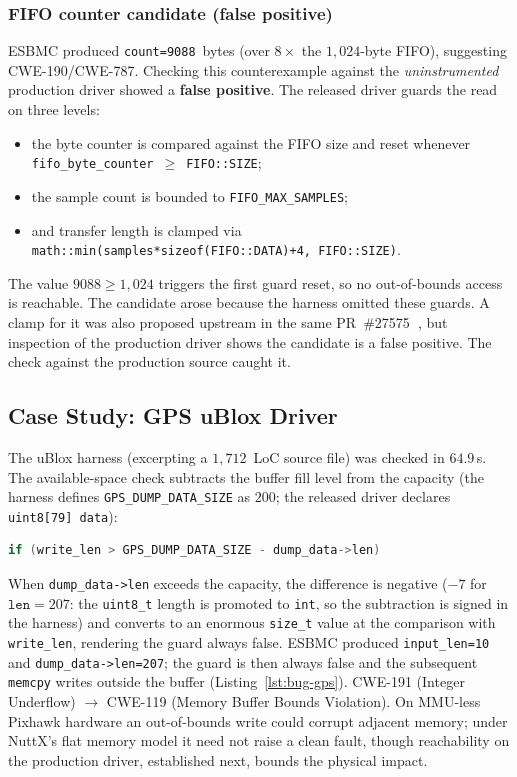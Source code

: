 \documentclass[conference]{IEEEtran}
\newcommand{\entra}[1]{#1}
\begin{document}
\subsubsection{FIFO counter candidate (false positive)}
ESBMC produced \texttt{count=9088}~bytes (over $8\times$ the
$1{,}024$-byte FIFO), suggesting CWE-190/CWE-787.
Checking this counterexample against the
\emph{uninstrumented} production driver showed a \textbf{false
positive}. The released driver guards the read on three levels:
\begin{itemize}
  \item the byte counter is compared against the FIFO size and reset
        whenever \texttt{fifo\_byte\_counter}~$\geq$~\texttt{FIFO::SIZE};
  \item the sample count is bounded to \texttt{FIFO\_MAX\_SAMPLES};
  \item and transfer length is clamped via\\
        \texttt{math::min(samples*sizeof(FIFO::DATA)+4, FIFO::SIZE)}.
\end{itemize}
The value $9088\geq1{,}024$ triggers the first guard reset,
so no out-of-bounds access is reachable. The candidate arose
because the harness omitted these guards. A clamp for it was also
proposed upstream in the same PR~\#27575\textbf{~\cite{PX4_PR27575}}, but inspection of
the production driver shows the candidate is a false positive. The
check against the production source caught it.

\subsection{Case Study: GPS uBlox Driver}
\label{subsec:case-gps}

The uBlox harness (excerpting a $1{,}712$~LoC source file) was checked in $64.9$\,s.
The available-space check subtracts the buffer fill level from the capacity (the harness defines \texttt{GPS\_DUMP\_DATA\_SIZE} as $200$; the released driver declares \texttt{uint8[79]~data}):
\begin{lstlisting}[language=C]
if (write_len > GPS_DUMP_DATA_SIZE - dump_data->len)
\end{lstlisting}
When \texttt{dump\_data->len} exceeds the capacity, the difference is negative ($-7$ for $\texttt{len}=207$: the \texttt{uint8\_t} length is promoted to \texttt{int}, so the subtraction is signed in the harness) and converts to an enormous \texttt{size\_t} value at the comparison with \texttt{write\_len}, rendering the guard always false.
ESBMC produced \texttt{input\_len=10} and
\texttt{dump\_data->len=207}; the guard is then always false and the
subsequent \texttt{memcpy} writes outside the buffer (Listing~\ref{lst:bug-gps}).
CWE-191 (Integer Underflow) $\to$ CWE-119
(Memory Buffer Bounds Violation).
On MMU-less Pixhawk hardware an out-of-bounds write could corrupt
adjacent memory; under NuttX's flat memory model it need not raise a
clean fault\entra{, though reachability on the production driver,
established next, bounds the physical
impact.}
\end{document}
